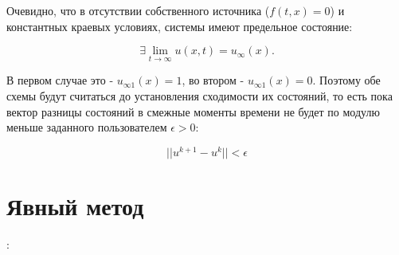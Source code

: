 Очевидно, что в отсутствии собственного источника ($f(t,x) = 0$) и константных краевых условиях, системы имеют предельное состояние:

\[\exists \lim\limits_{t \rightarrow \infty} u(x, t) = u_\infty (x).\]

В первом случае это - $u_{\infty1} (x) = 1$, во втором - $u_{\infty1} (x) = 0$. 
Поэтому обе схемы будут считаться до установления сходимости их состояний,
то есть пока вектор разницы состояний в смежные моменты времени не будет по модулю меньше заданного пользователем $\epsilon > 0$:

\[ ||u^{k+1} - u^k|| < \epsilon \]

\section{Явный метод}:

